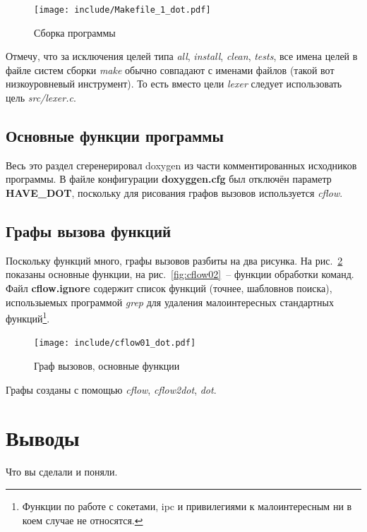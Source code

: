 \documentclass[a4paper,12pt]{report}
\begin{document}
\begin{figure}
\centering
\texttt{[image: include/Makefile\_1\_dot.pdf]}
\caption{Сборка программы}
\label{fig:make}
\end{figure}

Отмечу, что за исключения целей типа \textit{all}, \textit{install}, \textit{clean}, \textit{tests}, все имена целей в файле систем сборки \textit{make} обычно совпадают с именами файлов (такой вот низкоуровневый инструмент). То есть вместо цели \textit{lexer} следует использовать цель \textit{src/lexer.c}.

\section{Основные функции программы}

Весь это раздел сгеренерировал doxygen из части комментированных исходников программы. В файле конфигурации \textbf{doxyggen.cfg} был отключён параметр \textbf{HAVE\_DOT}, поскольку для рисования графов вызовов используется \textit{cflow}.

%
%
%
%
%
%
%
%

\section{Графы вызова функций}

Поскольку функций много, графы вызовов разбиты на два рисунка. На рис.~\ref{fig:cflow01} показаны основные функции, на рис.~\ref{fig:cflow02}~-- функции обработки команд. Файл \textbf{cflow.ignore} содержит список функций (точнее, шабловнов поиска), использыемых программой \textit{grep} для удаления малоинтересных стандартных функций\footnote{Функции по работе с сокетами, ipc и привилегиями к малоинтересным ни в коем случае не относятся.}.

\begin{figure}
\centering
\texttt{[image: include/cflow01\_dot.pdf]}
\caption{Граф вызовов, основные функции}
\label{fig:cflow01}
\end{figure}

Графы созданы с помощью \textit{cflow}, \textit{cflow2dot}, \textit{dot}.

\chapter*{Выводы}

Что вы сделали и поняли.
\end{document}
